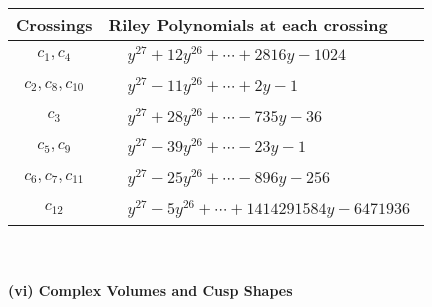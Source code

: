 \documentclass[1p]{elsarticle_modified}
\theoremstyle{definition}
\begin{document}
\begin{tabular}{m{50pt}|m{274pt}}
Crossings & \hspace{64pt}Riley Polynomials at each crossing \\
\hline $$\begin{aligned}c_{1},c_{4}\end{aligned}$$&$\begin{aligned}
&y^{27}+12 y^{26}+\cdots+2816 y-1024
\end{aligned}$\\
\hline $$\begin{aligned}c_{2},c_{8},c_{10}\end{aligned}$$&$\begin{aligned}
&y^{27}-11 y^{26}+\cdots+2 y-1
\end{aligned}$\\
\hline $$\begin{aligned}c_{3}\end{aligned}$$&$\begin{aligned}
&y^{27}+28 y^{26}+\cdots-735 y-36
\end{aligned}$\\
\hline $$\begin{aligned}c_{5},c_{9}\end{aligned}$$&$\begin{aligned}
&y^{27}-39 y^{26}+\cdots-23 y-1
\end{aligned}$\\
\hline $$\begin{aligned}c_{6},c_{7},c_{11}\end{aligned}$$&$\begin{aligned}
&y^{27}-25 y^{26}+\cdots-896 y-256
\end{aligned}$\\
\hline $$\begin{aligned}c_{12}\end{aligned}$$&$\begin{aligned}
&y^{27}-5 y^{26}+\cdots+1414291584 y-6471936
\end{aligned}$\\
\hline
\end{tabular}\\~\\
\newpage\flushleft \textbf{(vi) Complex Volumes and Cusp Shapes}
\end{document}
